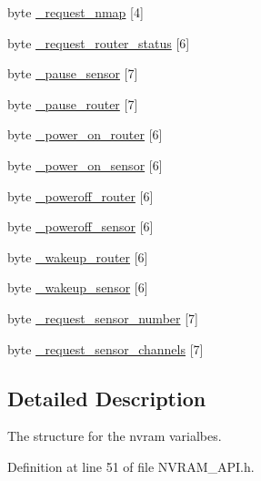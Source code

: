 \begin{DoxyCompactItemize}
\item 
byte \hyperlink{struct_n_v_r_a_m_1_1nv__data__t_acf47580a8e3b89cdd98ca35c36ae66d3}{\-\_\-request\-\_\-nmap} \mbox{[}4\mbox{]}
\item 
byte \hyperlink{struct_n_v_r_a_m_1_1nv__data__t_a070300099743ee9e82d379bf1f4b7640}{\-\_\-request\-\_\-router\-\_\-status} \mbox{[}6\mbox{]}
\item 
byte \hyperlink{struct_n_v_r_a_m_1_1nv__data__t_a062721d4f967e5c0a8b346f0268a2c87}{\-\_\-pause\-\_\-sensor} \mbox{[}7\mbox{]}
\item 
byte \hyperlink{struct_n_v_r_a_m_1_1nv__data__t_ad6bf29fb500a89c614653a1070706dbd}{\-\_\-pause\-\_\-router} \mbox{[}7\mbox{]}
\item 
byte \hyperlink{struct_n_v_r_a_m_1_1nv__data__t_adec0ad61099811c885cd755376550b54}{\-\_\-power\-\_\-on\-\_\-router} \mbox{[}6\mbox{]}
\item 
byte \hyperlink{struct_n_v_r_a_m_1_1nv__data__t_abd0e2dba804c48f27d07f76732390ed0}{\-\_\-power\-\_\-on\-\_\-sensor} \mbox{[}6\mbox{]}
\item 
byte \hyperlink{struct_n_v_r_a_m_1_1nv__data__t_a9eb1ca08d7fb842e408a1a0d09689bb9}{\-\_\-poweroff\-\_\-router} \mbox{[}6\mbox{]}
\item 
byte \hyperlink{struct_n_v_r_a_m_1_1nv__data__t_a2bb36a9095d5385c0d0b83a38961a2f4}{\-\_\-poweroff\-\_\-sensor} \mbox{[}6\mbox{]}
\item 
byte \hyperlink{struct_n_v_r_a_m_1_1nv__data__t_a94912aef206ddb9377726fdbc3b75e72}{\-\_\-wakeup\-\_\-router} \mbox{[}6\mbox{]}
\item 
byte \hyperlink{struct_n_v_r_a_m_1_1nv__data__t_a06f2246fa486db15716cf92d407c870f}{\-\_\-wakeup\-\_\-sensor} \mbox{[}6\mbox{]}
\item 
byte \hyperlink{struct_n_v_r_a_m_1_1nv__data__t_ae5a182afd183fd45ebaf344d3e6b02f6}{\-\_\-request\-\_\-sensor\-\_\-number} \mbox{[}7\mbox{]}
\item 
byte \hyperlink{struct_n_v_r_a_m_1_1nv__data__t_a3c6d659f58b471f079e65bc909775f24}{\-\_\-request\-\_\-sensor\-\_\-channels} \mbox{[}7\mbox{]}
\end{DoxyCompactItemize}


\subsection{Detailed Description}
The structure for the nvram varialbes. 

Definition at line 51 of file N\-V\-R\-A\-M\-\_\-\-A\-P\-I.\-h.



